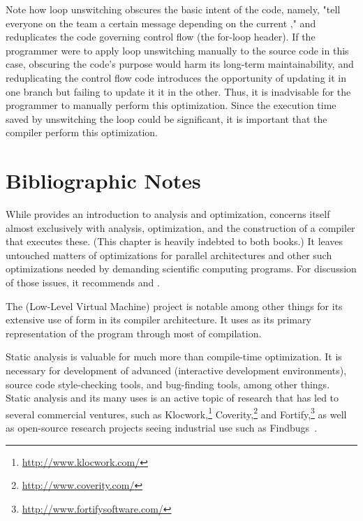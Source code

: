 Note how loop unswitching obscures the basic intent of the code, namely, "tell everyone on the team a certain message depending on the current ," and reduplicates the code governing control flow (the for-loop header). If the programmer were to apply loop unswitching manually to the source code in this case, obscuring the code's purpose would harm its long-term maintainability, and reduplicating the control flow code introduces the opportunity of updating it in one branch but failing to update it it in the other. Thus, it is inadvisable for the programmer to manually perform this optimization. Since the execution time saved by unswitching the loop could be significant, it is important that the compiler perform this optimization.






\section{Bibliographic Notes}
While \citet[chapters~8--10]{Cooper:Engineering:2004} provides an introduction to analysis and optimization, \citet{Muchnick:Advanced:1997} concerns itself almost exclusively with analysis, optimization, and the construction of a compiler that executes these. (This chapter is heavily indebted to both books.) It leaves untouched matters of optimizations for parallel architectures and other such optimizations needed by demanding scientific computing programs. For discussion of those issues, it recommends \citet{Bannerjee:Dependence:1988,Bannerjee:Loop:1993,Bannerjee:Loop:1994,Wolfe:High-Performance:1996} and \citet{Zima:Supercompilers:1991}.

The  (Low-Level Virtual Machine) project \citep{Lattner:LLVM:2002} is notable among other things for its extensive use of \SSA form in its compiler architecture. It uses \SSA as its primary representation of the program through most of compilation.

Static analysis is valuable for much more than compile-time optimization. It is necessary for development of advanced  (interactive development environments), source code style-checking tools, and bug-finding tools, among other things. Static analysis and its many uses is an active topic of research that has led to several commercial ventures, such as Klocwork,\footnote{\url{http://www.klocwork.com/}} Coverity,\footnote{\url{http://www.coverity.com/}} and Fortify,\footnote{\url{http://www.fortifysoftware.com/}} as well as open-source research projects seeing industrial use such as Findbugs~\citep{Hovemeyer:Finding:2004}.